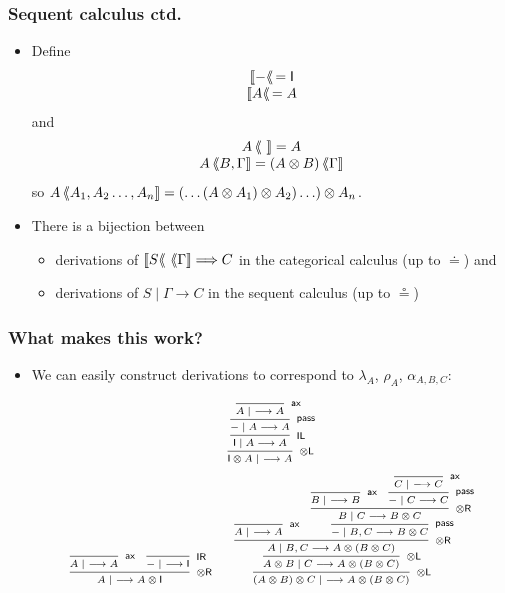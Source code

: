 \documentclass[10pt,t]{beamer}
\newcommand{\I}{\mathsf{I}}
\newcommand{\ot}{\otimes}
\newcommand{\al}{\alpha}
\newcommand{\lam}{\lambda}
\newcommand{\n}{{-}}
\newcommand{\tto}{\Longrightarrow}
\newcommand{\ax}{\mathsf{ax}}
\newcommand{\uf}{\mathsf{pass}}
\newcommand{\IL}{\I\mathsf{L}}
\newcommand{\otL}{\ot\mathsf{L}}
\newcommand{\IR}{\I\mathsf{R}}
\newcommand{\otR}{\ot\mathsf{R}}
\renewcommand{\vdash}{\longrightarrow}
\newcommand{\lb}{\langle\hspace*{-0.9mm}\langle}
\newcommand{\csem}[2]{#1\, \lb #2 \rrbracket}
\newcommand{\ssem}[1]{\llbracket #1 \lb\, }
\begin{document}
\begin{frame}

\frametitle{Sequent calculus ctd.}

\begin{itemize}

\item Define
\[
\begin{array}{c}
\ssem{\n} = \I \\ 
\ssem{A} = A
\end{array}
\]
and
\[
\begin{array}{c}
\csem{A}{~} = A \\
\csem{A}{B, \Gamma} = \csem{(A \otimes B)}{\Gamma}  
\end{array}
\]
so $\csem{A}{A_1, A_2 \ldots, A_n} = (\ldots (A \otimes A_1)
  \otimes A_2) \ldots) \otimes A_n$.

\bigskip

\item There is a bijection between
\begin{itemize}
\item derivations of
  $\csem{\ssem{S}}{\Gamma} \tto C$ in the categorical calculus (up to
  $\doteq$) and
\item derivations of  $S \mid \Gamma \vdash C$
  in the sequent calculus (up to $\circeq$) 
\end{itemize}

\end{itemize}

\end{frame}


\begin{frame}

\frametitle{What makes this work?}

\begin{itemize}

\item We can easily construct derivations to correspond to $\lam_A$,
  $\rho_A$, $\al_{A,B,C}$:

\[
\scriptsize
\infer[\otL]{\I \ot A \mid ~ \vdash A}{
  \infer[\IL]{\I \mid A \vdash A}{
    \infer[\uf]{\n \mid A \vdash A}{
      \infer[\ax]{A \mid ~ \vdash A}{
      }
    }
  }
}
\]
\[
\scriptsize
\infer[\otR]{A \mid ~ \vdash A \ot \I}{
  \infer[\ax]{A \mid ~ \vdash A}{
  }
  &
  \infer[\IR]{\n \mid ~ \vdash \I}{
  }
}
\qquad
\infer[\otL]{(A \ot B) \ot C \mid ~ \vdash A \ot (B \ot C)}{
  \infer[\otL]{A \ot B \mid C \vdash A \ot (B \ot C)}{
    \infer[\otR]{A \mid B, C \vdash A \ot (B \ot C)}{
      \infer[\ax]{A \mid ~ \vdash A}{
      }
      &
      \infer[\uf]{\n \mid B, C \vdash B \ot C}{
        \infer[\otR]{B \mid C \vdash B \ot C}{
          \infer[\ax]{B \mid ~ \vdash B}{
          }
          &
          \infer[\uf]{\n \mid C \vdash C}{
            \infer[\ax]{C \mid ~ \vdash C}{
            }
          }
        }
      }
    }
  }
}
\]


\end{itemize}

\end{frame}
\end{document}
